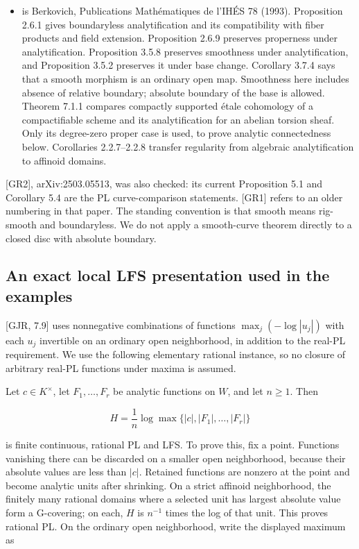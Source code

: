\documentclass[11pt,a4paper]{article}
\begin{document}
\begin{itemize}
\item [Ber] is Berkovich, Publications Mathématiques de l'IHÉS 78 (1993). Proposition 2.6.1 gives boundaryless analytification and its compatibility with fiber products and field extension. Proposition 2.6.9 preserves properness under analytification. Proposition 3.5.8 preserves smoothness under analytification, and Proposition 3.5.2 preserves it under base change. Corollary 3.7.4 says that a smooth morphism is an ordinary open map. Smoothness here includes absence of relative boundary; absolute boundary of the base is allowed. Theorem 7.1.1 compares compactly supported étale cohomology of a compactifiable scheme and its analytification for an abelian torsion sheaf. Only its degree-zero proper case is used, to prove analytic connectedness below. Corollaries 2.2.7--2.2.8 transfer regularity from algebraic analytification to affinoid domains.

\end{itemize}
[GR2], arXiv:2503.05513, was also checked: its current Proposition 5.1 and Corollary 5.4 are the PL curve-comparison statements. [GR1] refers to an older numbering in that paper. The standing convention is that smooth means rig-smooth and boundaryless. We do not apply a smooth-curve theorem directly to a closed disc with absolute boundary.

\subsection*{An exact local LFS presentation used in the examples}

[GJR, 7.9] uses nonnegative combinations of functions \(\max_j(-\log|u_j|)\) with each \(u_j\) invertible on an ordinary open neighborhood, in addition to the real-PL requirement. We use the following elementary rational instance, so no closure of arbitrary real-PL functions under maxima is assumed.

Let \(c\in K^\times\), let \(F_1,\ldots,F_r\) be analytic functions on \(W\), and let \(n\geq1\). Then

\[
H=\frac1n\log\max\{|c|,|F_1|,\ldots,|F_r|\}
\]

is finite continuous, rational PL and LFS. To prove this, fix a point. Functions vanishing there can be discarded on a smaller open neighborhood, because their absolute values are less than \(|c|\). Retained functions are nonzero at the point and become analytic units after shrinking. On a strict affinoid neighborhood, the finitely many rational domains where a selected unit has largest absolute value form a G-covering; on each, \(H\) is \(n^{-1}\) times the log of that unit. This proves rational PL. On the ordinary open neighborhood, write the displayed maximum as
\end{document}
